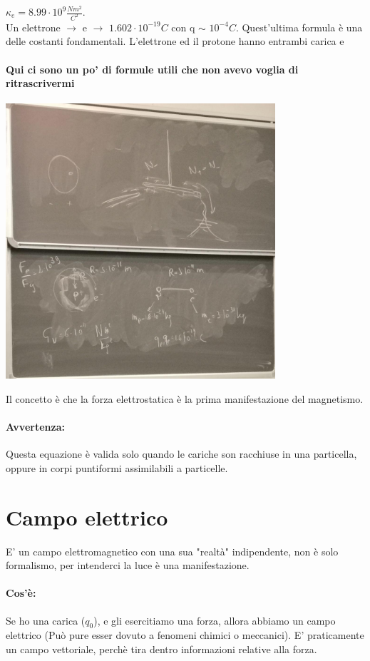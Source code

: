 \documentclass[12pt, a4paper, openany, oneside]{book}
\begin{document}
$\kappa_{e} = 8.99\cdot10^{9} \frac{Nm^{2}}{C^{2}}$.\\
Un elettrone $\to$ e $\to$ $1.602 \cdot 10^{-19}C$ con q $\sim$ $10^{-4}C$.
Quest'ultima formula è una delle costanti fondamentali. L'elettrone ed il 
protone hanno entrambi carica e 
\paragraph{Qui ci sono un po' di formule utili che non avevo voglia di
ritrascrivermi}
\begin{center}
\includegraphics[width=0.75\textwidth]{19}
\end{center}
Il concetto è che la forza elettrostatica è la prima manifestazione del magnetismo.
\paragraph{Avvertenza: }Questa equazione è valida solo quando le cariche son
racchiuse in una particella, oppure in corpi puntiformi assimilabili a particelle.
\section{Campo elettrico}
E' un campo elettromagnetico con una sua "realtà" indipendente, non è solo
formalismo, per intenderci la luce è una manifestazione.
\paragraph{Cos'è: }Se ho una carica ($q_{0}$), e gli esercitiamo una forza, allora
abbiamo un campo elettrico (Può pure esser dovuto a fenomeni chimici o 
meccanici). E' praticamente un campo vettoriale, perchè tira dentro informazioni
relative alla forza.
\end{document}
